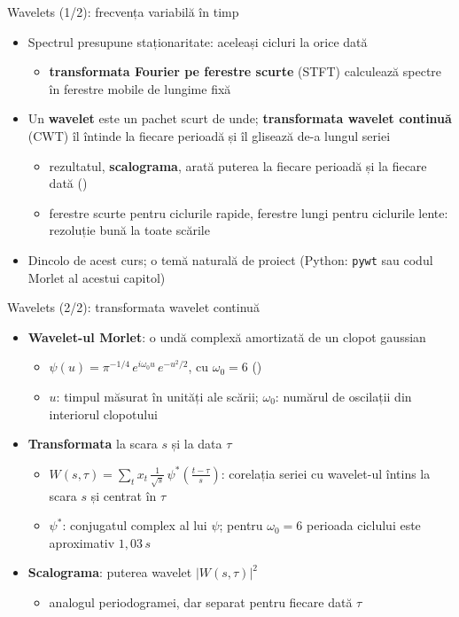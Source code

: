 \begin{frame}{Wavelets (1/2): frecvența variabilă în timp}
\itemsize{\small}
\begin{itemize}
    \item Spectrul presupune staționaritate: aceleași cicluri la orice dată
    \begin{itemize}
        \item \textbf{transformata Fourier pe ferestre scurte} (STFT) calculează spectre în ferestre mobile de lungime fixă
    \end{itemize}
    \item Un \textbf{wavelet} este un pachet scurt de unde; \textbf{transformata wavelet continuă} (CWT) îl întinde la fiecare perioadă și îl glisează de-a lungul seriei
    \begin{itemize}
        \item rezultatul, \textbf{scalograma}, arată puterea la fiecare perioadă și la fiecare dată ()
        \item ferestre scurte pentru ciclurile rapide, ferestre lungi pentru ciclurile lente: rezoluție bună la toate scările
    \end{itemize}
    \item Dincolo de acest curs; o temă naturală de proiect (Python: \texttt{pywt} sau codul Morlet al acestui capitol)
\end{itemize}
\end{frame}

\begin{frame}{Wavelets (2/2): transformata wavelet continuă}
\itemsize{\footnotesize}
\begin{itemize}
    \item \textbf{Wavelet-ul Morlet}: o undă complexă amortizată de un clopot gaussian
    \begin{itemize}
        \item $\psi(u) = \pi^{-1/4}\, e^{i\omega_0 u}\, e^{-u^2/2}$, cu $\omega_0 = 6$ ()
        \item $u$: timpul măsurat în unități ale scării; $\omega_0$: numărul de oscilații din interiorul clopotului
    \end{itemize}
    \item \textbf{Transformata} la scara $s$ și la data $\tau$
    \begin{itemize}
        \item $W(s, \tau) = \sum_t x_t\, \frac{1}{\sqrt{s}}\, \psi^*\!\left(\frac{t - \tau}{s}\right)$: corelația seriei cu wavelet-ul întins la scara $s$ și centrat în $\tau$
        \item $\psi^*$: conjugatul complex al lui $\psi$; pentru $\omega_0 = 6$ perioada ciclului este aproximativ $1{,}03\,s$
    \end{itemize}
    \item \textbf{Scalograma}: puterea wavelet $|W(s, \tau)|^2$
    \begin{itemize}
        \item analogul periodogramei, dar separat pentru fiecare dată $\tau$
    \end{itemize}
\end{itemize}
\end{frame}

